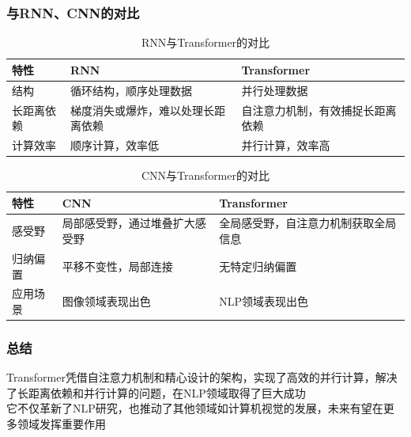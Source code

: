 \begin{frame}
	\frametitle{与\textrm{RNN}、\textrm{CNN}的对比}
    \begin{table}[ht]
        \centering
        \begin{tabular}{|l|l|l|}
            \hline
	    特性 & \textrm{RNN} & \textrm{Transformer} \\
            \hline
            结构 & 循环结构，顺序处理数据 & 并行处理数据 \\
            \hline
            长距离依赖 & 梯度消失或爆炸，难以处理长距离依赖 & 自注意力机制，有效捕捉长距离依赖 \\
            \hline
            计算效率 & 顺序计算，效率低 & 并行计算，效率高 \\
            \hline
        \end{tabular}
	\caption{\textrm{RNN}与\textrm{Transformer}的对比}
    \end{table}
    \begin{table}[ht]
        \centering
        \begin{tabular}{|l|l|l|}
            \hline
	    特性 & \textrm{CNN} & \textrm{Transformer} \\
            \hline
            感受野 & 局部感受野，通过堆叠扩大感受野 & 全局感受野，自注意力机制获取全局信息 \\
            \hline
            归纳偏置 & 平移不变性，局部连接 & 无特定归纳偏置 \\
            \hline
            应用场景 & 图像领域表现出色 & NLP领域表现出色 \\
            \hline
        \end{tabular}
	\caption{\textrm{CNN}与\textrm{Transformer}的对比}
    \end{table}
\end{frame}

\begin{frame}
    \frametitle{总结}
    \textrm{Transformer}凭借自注意力机制和精心设计的架构，实现了高效的并行计算，解决了长距离依赖和并行计算的问题，在\textrm{NLP}领域取得了巨大成功\\

    它不仅革新了\textrm{NLP}研究，也推动了其他领域如计算机视觉的发展，未来有望在更多领域发挥重要作用
\end{frame}
